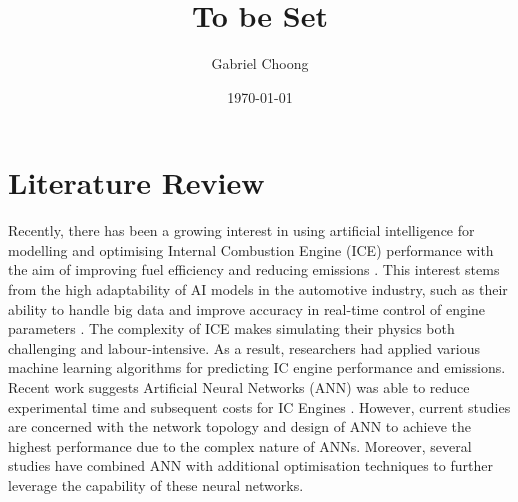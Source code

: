 \documentclass[a4paper, 12pt]{article}
\title{To be Set}
\author{Gabriel Choong}
\date{\today}
\begin{document}
\maketitle



\section{Literature Review}
Recently, there has been a growing interest in using artificial intelligence for modelling and optimising Internal Combustion Engine (ICE) performance with the aim of improving fuel efficiency and reducing emissions \parencite{karunamurthyPredictionICEngine2023}. This interest stems from the high adaptability of AI models in the automotive industry, such as their ability to handle big data and improve accuracy in real-time control of engine parameters \parencite{inezahavugimanaReviewArtificialIntelligent2023}. The complexity of ICE makes simulating their physics both challenging and labour-intensive. As a result, researchers had applied various machine learning algorithms for predicting IC engine performance and emissions. Recent work suggests Artificial Neural Networks (ANN) was able to reduce experimental time and subsequent costs for IC Engines \parencite{bhattApplicationArtificialNeural2022, tuanhoangReviewApplicationArtificial2021}. However, current studies are concerned with the network topology and design of ANN to achieve the highest performance due to the complex nature of ANNs. Moreover, several studies have combined ANN with additional optimisation techniques to further leverage the capability of these neural networks.
\end{document}

